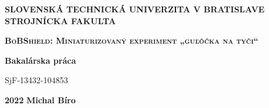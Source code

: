 \renewcommand\thepage{\roman{page}}
\thispagestyle{empty}

\noindent \begin{center}
	\textbf{{\large{}SLOVENSKÁ TECHNICKÁ UNIVERZITA V BRATISLAVE}}\\
	\textbf{{\large{}STROJNÍCKA FAKULTA}}\textbf{\large{} }\\
	\vspace{3cm}
	\par\end{center}

\noindent \begin{center}
	\vspace{3cm}
	\par\end{center}



\begin{center}
	\textbf{\textsc{\Large{}BoBShield: Miniaturizovaný experiment „guľôčka na tyči“}}\\
	\par\end{center}{\Large \par}

\begin{center}
	\textbf{\large{}Bakalárska práca}\\
	\par\end{center}{\large \par}

\begin{center}
	{\large{}SjF-13432-104853}\\
	\par\end{center}{\large \par}



\vfill
\noindent \textbf{\large{}2022} \hfill \textbf{\large{}Michal Bíro}
\cleardoublepage